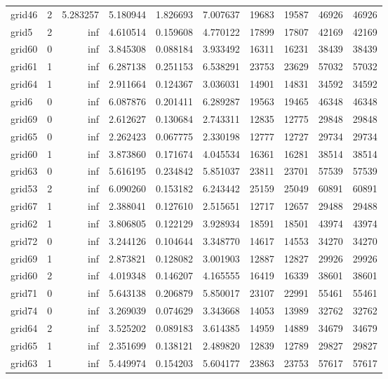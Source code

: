 \begin{longtable}{|l|r|r|r|r|r|r|r|r|r|}
grid46 & 2 & 5.283257 & 5.180944 & 1.826693 & 7.007637 & 19683 & 19587 & 46926 & 46926 \\
grid5 & 2 & inf & 4.610514 & 0.159608 & 4.770122 & 17899 & 17807 & 42169 & 42169 \\
grid60 & 0 & inf & 3.845308 & 0.088184 & 3.933492 & 16311 & 16231 & 38439 & 38439 \\
grid61 & 1 & inf & 6.287138 & 0.251153 & 6.538291 & 23753 & 23629 & 57032 & 57032 \\
grid64 & 1 & inf & 2.911664 & 0.124367 & 3.036031 & 14901 & 14831 & 34592 & 34592 \\
grid6 & 0 & inf & 6.087876 & 0.201411 & 6.289287 & 19563 & 19465 & 46348 & 46348 \\
grid69 & 0 & inf & 2.612627 & 0.130684 & 2.743311 & 12835 & 12775 & 29848 & 29848 \\
grid65 & 0 & inf & 2.262423 & 0.067775 & 2.330198 & 12777 & 12727 & 29734 & 29734 \\
grid60 & 1 & inf & 3.873860 & 0.171674 & 4.045534 & 16361 & 16281 & 38514 & 38514 \\
grid63 & 0 & inf & 5.616195 & 0.234842 & 5.851037 & 23811 & 23701 & 57539 & 57539 \\
grid53 & 2 & inf & 6.090260 & 0.153182 & 6.243442 & 25159 & 25049 & 60891 & 60891 \\
grid67 & 1 & inf & 2.388041 & 0.127610 & 2.515651 & 12717 & 12657 & 29488 & 29488 \\
grid62 & 1 & inf & 3.806805 & 0.122129 & 3.928934 & 18591 & 18501 & 43974 & 43974 \\
grid72 & 0 & inf & 3.244126 & 0.104644 & 3.348770 & 14617 & 14553 & 34270 & 34270 \\
grid69 & 1 & inf & 2.873821 & 0.128082 & 3.001903 & 12887 & 12827 & 29926 & 29926 \\
grid60 & 2 & inf & 4.019348 & 0.146207 & 4.165555 & 16419 & 16339 & 38601 & 38601 \\
grid71 & 0 & inf & 5.643138 & 0.206879 & 5.850017 & 23107 & 22991 & 55461 & 55461 \\
grid74 & 0 & inf & 3.269039 & 0.074629 & 3.343668 & 14053 & 13989 & 32762 & 32762 \\
grid64 & 2 & inf & 3.525202 & 0.089183 & 3.614385 & 14959 & 14889 & 34679 & 34679 \\
grid65 & 1 & inf & 2.351699 & 0.138121 & 2.489820 & 12839 & 12789 & 29827 & 29827 \\
grid63 & 1 & inf & 5.449974 & 0.154203 & 5.604177 & 23863 & 23753 & 57617 & 57617 \\

\end{longtable}
